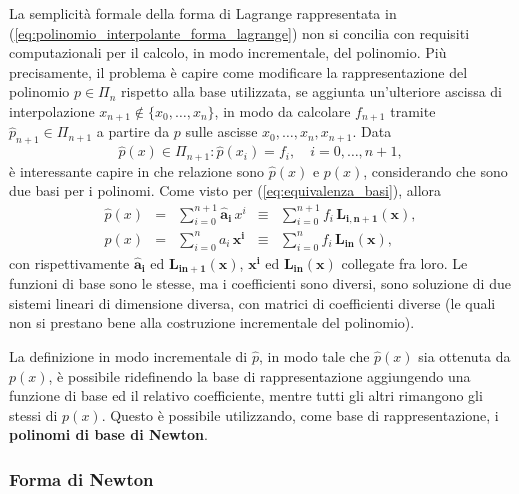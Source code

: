 
La semplicità formale della forma di Lagrange rappresentata in (\ref{eq:polinomio_interpolante_forma_lagrange}) non si concilia con requisiti computazionali per il calcolo, in modo incrementale, del polinomio. Più precisamente, il problema è capire come modificare la rappresentazione del polinomio $p\in\Pi_n$ rispetto alla base utilizzata, se aggiunta un'ulteriore ascissa di interpolazione $x_{n+1}\notin\{x_0,\hdots,x_n\}$, in modo da calcolare $f_{n+1}$ tramite $\widehat{p}_{n+1}\in\Pi_{n+1}$ a partire da $p$ sulle ascisse $x_0,\hdots,x_n, x_{n+1}$. Data
\begin{equation*}
	\widehat{p}(x)\in\Pi_{n+1}:\widehat{p}(x_i)=f_i,\quad i=0,\hdots,n+1,
\end{equation*}
è interessante capire in che relazione sono $\widehat{p}(x)$ e $p(x)$, considerando che sono due basi per i polinomi. Come visto per (\ref{eq:equivalenza_basi}), allora
\begin{equation}
    \begin{matrix}
         \widehat{p}(x)&=&\sum_{i=0}^{n+1}\boldsymbol{\widehat{a}_i}\, x^i&\equiv&\sum_{i=0}^{n+1} f_i\, \boldsymbol{L_{i,n+1}(x)},\\
        p(x)&=&\sum_{i=0}^n a_i\,\boldsymbol{x^i}&\equiv&\sum_{i=0}^n f_i\, \boldsymbol{L_{in}(x)},
    \end{matrix}
\end{equation}
con rispettivamente $\boldsymbol{\widehat{a}_i}$ ed $\boldsymbol{L_{in+1}(x)}$, $\boldsymbol{x^i}$ ed $\boldsymbol{L_{in}(x)}$ collegate fra loro.
Le funzioni di base sono le stesse, ma i coefficienti sono diversi, sono soluzione di due sistemi lineari di dimensione diversa, con matrici di coefficienti diverse (le quali non si prestano bene alla costruzione incrementale del polinomio). 

La definizione in modo incrementale di $\widehat{p}$, in modo tale che $\widehat p(x)$ sia ottenuta da $p(x)$, è possibile ridefinendo la base di  rappresentazione aggiungendo una funzione di base ed il relativo coefficiente, mentre tutti gli altri rimangono gli stessi di $p(x)$. Questo è possibile utilizzando, come base di rappresentazione, i \textbf{polinomi di base di Newton}.

\subsubsection{Forma di Newton}

